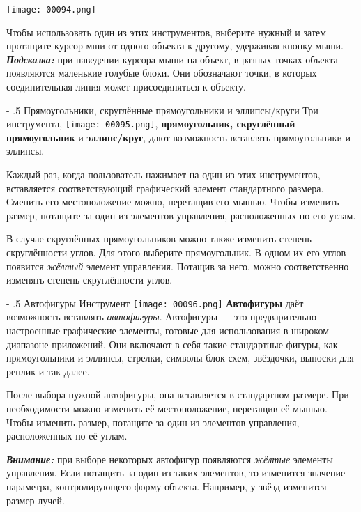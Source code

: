﻿\documentclass[a4paper,10pt]{article}
\makeatletter
\renewcommand\paragraph{%
   \@startsection{paragraph}{4}{0mm}%
      {-\baselineskip}%
      {.5\baselineskip}%
      {\normalfont\normalsize\bfseries}}
\makeatother
\begin{document}
\texttt{[image: 00094.png]}

Чтобы использовать один из этих инструментов, выберите нужный и затем протащите курсор мши от одного объекта к другому, удерживая кнопку мыши. \textit{\textbf{Подсказка:}} при наведении курсора мыши на объект, в разных точках объекта появляются маленькие голубые блоки. Они обозначают точки, в которых соединительная линия может присоединяться к объекту.

\paragraph{Прямоугольники, скруглённые прямоугольники и эллипсы/круги}
Три инструмента, \texttt{[image: 00095.png]}, \textbf{прямоугольник, скруглённый прямоугольник} и \textbf{эллипс/круг}, дают возможность вставлять прямоугольники и эллипсы.

Каждый раз, когда пользователь нажимает на один из этих инструментов, вставляется соответствующий графический элемент стандартного размера. Сменить его местоположение можно, перетащив его мышью. Чтобы изменить размер, потащите за один из элементов управления, расположенных по его углам.

В случае скруглённых прямоугольников можно также изменить степень скруглённости углов. Для этого выберите прямоугольник. В одном их его углов появится \textit{жёлтый} элемент управления. Потащив за него, можно соответственно изменять степень скруглённости углов.

\paragraph{Автофигуры}
Инструмент \texttt{[image: 00096.png]} \textbf{Автофигуры} даёт возможность вставлять \textit{автофигуры}. Автофигуры — это предварительно настроенные графические элементы, готовые для использования в широком диапазоне приложений. Они включают в себя такие стандартные фигуры, как прямоугольники и эллипсы, стрелки, символы блок-схем, звёздочки, выноски для реплик и так далее.

После выбора нужной автофигуры, она вставляется в стандартном размере. При необходимости можно изменить её местоположение, перетащив её мышью.
Чтобы изменить размер, потащите за один из элементов управления, расположенных по её углам.

\textit{\textbf{Внимание:}} при выборе некоторых автофигур появляются \textit{жёлтые} элементы управления. Если потащить за один из таких элементов, то изменится значение параметра, контролирующего форму объекта. Например, у звёзд изменится размер лучей.
\end{document}
